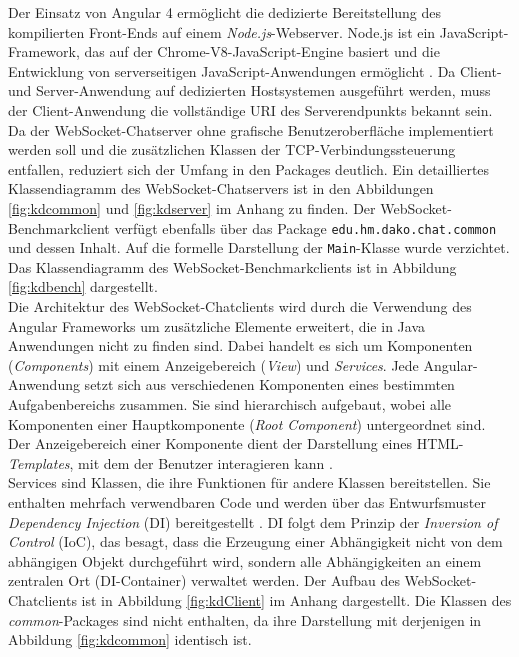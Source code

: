 \documentclass[11pt,a4paper,titlepage]{scrartcl}
\numberwithin{equation}{section}
\begin{document}
\noindent Der Einsatz von Angular 4 ermöglicht die dedizierte Bereitstellung des kompilierten Front-Ends auf einem \textit{Node.js}-Webserver. Node.js ist ein JavaScript-Framework, das auf der Chrome-V8-JavaScript-Engine basiert und die Entwicklung von serverseitigen JavaScript-Anwendungen ermöglicht \autocite{node_js_foundation_node.js_2018}. Da Client- und Server-Anwendung auf dedizierten Hostsystemen ausgeführt werden, muss der Client-Anwendung die vollständige URI des Serverendpunkts bekannt sein.\\

\noindent Da der WebSocket-Chatserver ohne grafische Benutzeroberfläche implementiert werden soll und die zusätzlichen Klassen der TCP-Verbindungssteuerung entfallen, reduziert sich der Umfang in den Packages deutlich. Ein detailliertes Klassendiagramm des WebSocket-Chatservers ist in den Abbildungen \ref{fig:kdcommon} und \ref{fig:kdserver} im Anhang zu finden. Der WebSocket-Benchmarkclient verfügt ebenfalls über das Package \texttt{edu.hm.dako.chat.common} und dessen Inhalt. Auf die formelle Darstellung der \texttt{Main}-Klasse wurde verzichtet. Das Klassendiagramm des WebSocket-Benchmarkclients ist in Abbildung \ref{fig:kdbench} dargestellt. \\

\noindent Die Architektur des WebSocket-Chatclients wird durch die Verwendung des Angular Frameworks um zusätzliche Elemente erweitert, die in Java Anwendungen nicht zu finden sind. Dabei handelt es sich um Komponenten (\textit{Components}) mit einem Anzeigebereich (\textit{View}) und \textit{Services}. Jede Angular-Anwendung setzt sich aus verschiedenen Komponenten eines bestimmten Aufgabenbereichs zusammen. Sie sind hierarchisch aufgebaut, wobei alle Komponenten einer Hauptkomponente (\textit{Root Component}) untergeordnet sind. Der Anzeigebereich einer Komponente dient der Darstellung eines HTML-\textit{Templates}, mit dem der Benutzer interagieren kann \autocite[66]{woiwode_angular_2017}. \\

\noindent Services sind Klassen, die ihre Funktionen für andere Klassen bereitstellen. Sie enthalten mehrfach verwendbaren Code und werden über das Entwurfsmuster \textit{Dependency Injection} (DI) bereitgestellt \autocite[117]{woiwode_angular_2017}. DI folgt dem Prinzip der \textit{Inversion of Control} (IoC), das besagt, dass die Erzeugung einer Abhängigkeit nicht von dem abhängigen Objekt durchgeführt wird, sondern alle Abhängigkeiten an einem zentralen Ort (DI-Container) verwaltet werden. Der Aufbau des WebSocket-Chatclients ist in Abbildung \ref{fig:kdClient} im Anhang dargestellt. Die Klassen des \textit{common}-Packages sind nicht enthalten, da ihre Darstellung mit derjenigen in Abbildung \ref{fig:kdcommon} identisch ist.
\end{document}
